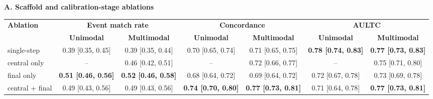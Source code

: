 \begin{table}[h] 
\setlength{\tabcolsep}{3pt} \renewcommand{\arraystretch}{1.08} 
{ 
\begin{minipage}{\textwidth} 
\scriptsize 
\noindent\textbf{A. Scaffold and calibration-stage ablations}\par
\vspace{2pt}
\begin{tabular*}{\textwidth}{@{\extracolsep{\fill}}lcccccc@{}} 
\hline 
\multirow{2}{*}{\textbf{Ablation}} 
& \multicolumn{2}{c}{\textbf{Event match rate}} 
& \multicolumn{2}{c}{\textbf{Concordance}} 
& \multicolumn{2}{c}{\textbf{AULTC}} \\ 
\cline{2-7} 
& \textbf{Unimodal} 
& \textbf{Multimodal} 
& \textbf{Unimodal} 
& \textbf{Multimodal} 
& \textbf{Unimodal} 
& \textbf{Multimodal} \\ 
\hline 
single-step 
& 0.39 [0.35, 0.45] 
& 0.39 [0.35, 0.44] 
& 0.70 [0.65, 0.74] 
& 0.71 [0.65, 0.75] 
& \textbf{0.78 [0.74, 0.83]} 
& \textbf{0.77 [0.73, 0.83]} \\ 
central only 
& -- 
& 0.46 [0.42, 0.51] 
& -- 
& 0.72 [0.66, 0.77] 
& -- 
& 0.75 [0.71, 0.80] \\ 
final only 
& \textbf{0.51 [0.46, 0.56]} 
& \textbf{0.52 [0.46, 0.58]} 
& 0.68 [0.64, 0.72] 
& 0.69 [0.64, 0.72] 
& 0.72 [0.67, 0.78] 
& 0.73 [0.69, 0.78] \\ 
central + final 
& 0.49 [0.43, 0.56]
& 0.49 [0.43, 0.56]
& \textbf{0.74 [0.70, 0.80]}
& \textbf{0.77 [0.73, 0.81]}
& 0.71 [0.64, 0.78] 
& \textbf{0.77 [0.73, 0.81]} \\
\hline 
\end{tabular*}


\end{minipage}}
\end{table}
